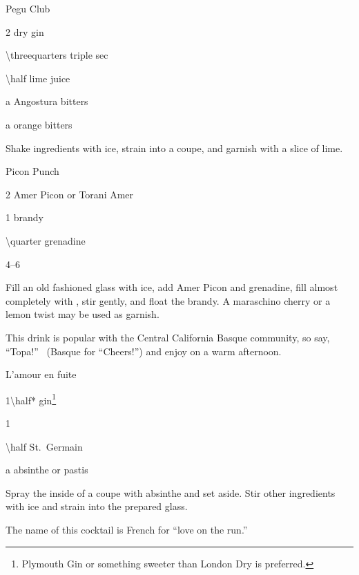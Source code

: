 \begin{Cocktail}{Pegu Club}
	\begin{Ingredients}
	\item \SI{2}{\oz} dry gin
	\item \SI{\threequarters}{\oz} triple sec
	\item \SI{\half}{\oz} lime juice
	\item a \si{\dash} Angostura bitters
	\item a \si{\dash} orange bitters
	\end{Ingredients}
	
	\begin{Instructions}
	Shake ingredients with ice, strain into a coupe, and garnish with a slice of lime.
	\end{Instructions}
\end{Cocktail}

\begin{Cocktail}{Picon Punch}
	\begin{Ingredients}
	\item \SI{2}{\oz} Amer Picon or Torani Amer
	\item \SI{1}{\oz} brandy
	\item \SI{\quarter}{\oz} grenadine
	\item \SIrange{4}{6}{\oz} \soda\/
	\end{Ingredients}
	
	\begin{Instructions}
	Fill an old fashioned glass with ice, add Amer Picon and grenadine, fill almost completely with \soda\/, stir gently, and float the brandy.  A maraschino cherry or a lemon twist may be used as garnish.
	
	This drink is popular with the Central California Basque community, so say, ``Topa!''\  (Basque for ``Cheers!'') and enjoy on a warm afternoon. %
	\end{Instructions}
\end{Cocktail}

\begin{Cocktail}{L'amour en fuite}
	\begin{Ingredients}
	\item \SI{1\half*}{\oz} gin\footnote{Plymouth Gin or something sweeter than London Dry is preferred.}
	\item \SI{1}{\oz} \Lillet
	\item \SI{\half}{\oz} St.\ Germain
	\item a \si{\spritz} absinthe or pastis
	\end{Ingredients}
	
	\begin{Instructions}
	Spray the inside of a coupe with absinthe and set aside.  Stir other ingredients with ice and strain into the prepared glass.
	
	The name of this cocktail is French for ``love on the run.''
	\end{Instructions}
\end{Cocktail}

